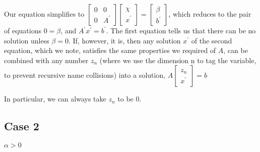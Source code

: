 \documentclass{article}
\begin{document}
Our equation simplifies to 
\begin{math}{}
\begin{bmatrix}0 & 0 \\ 0 & A^{'}\end{bmatrix}\begin{bmatrix}\chi\\x^{'}\end{bmatrix} =\begin{bmatrix}\beta\\b^{'}\end{bmatrix}
\end{math}, which reduces to the pair of equations \begin{math}0=\beta{}\end{math}, and
\begin{math}{}A^{'}x^{'}=b^{'} \end{math}. The first equation tells us that there can be no solution unless
\begin{math}{}\beta=0\end{math}. If, however, it is, then any solution \begin{math}{}x^{'}\end{math} of the
second equation, which we note, satisfies the same properties we required of 
\begin{math}{}A\end{math}, can be combined with any number \begin{math}{}z_n\end{math} (where we use the dimension n to tag the variable, to prevent recursive name collisions)
into a solution, \begin{math}{}A\begin{bmatrix}z_n\\x^{'}\end{bmatrix} = b\end{math}

In particular, we can always take \begin{math}{}z_n\end{math} to be 0.

\subsection{Case 2}
\begin{math}{}\alpha>0\end{math}
\end{document}
